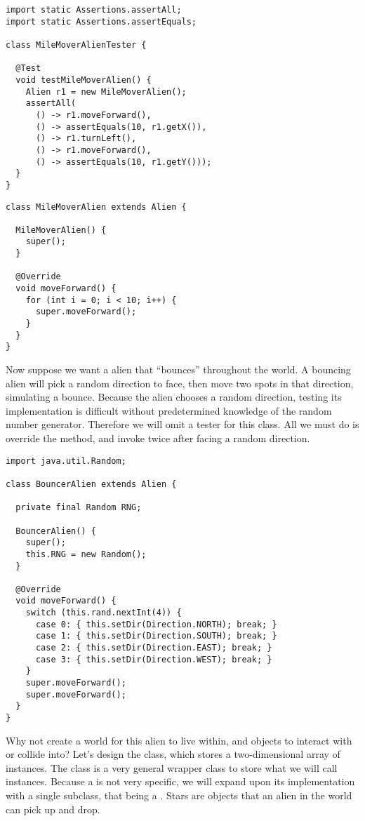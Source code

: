 \begin{lstlisting}[language=MyJava]
import static Assertions.assertAll;
import static Assertions.assertEquals;

class MileMoverAlienTester {

  @Test
  void testMileMoverAlien() {
    Alien r1 = new MileMoverAlien();
    assertAll(
      () -> r1.moveForward(),
      () -> assertEquals(10, r1.getX()),
      () -> r1.turnLeft(),
      () -> r1.moveForward(),
      () -> assertEquals(10, r1.getY()));
  }
}
\end{lstlisting}

\begin{lstlisting}[language=MyJava]
class MileMoverAlien extends Alien {

  MileMoverAlien() { 
    super(); 
  }

  @Override
  void moveForward() {
    for (int i = 0; i < 10; i++) { 
      super.moveForward(); 
    }
  }
}
\end{lstlisting}

Now suppose we want a alien that ``bounces'' throughout the world. 
A bouncing alien will pick a random direction to face, then move two spots in that direction, simulating a bounce. 
Because the alien chooses a random direction, testing its implementation is difficult without predetermined knowledge of the random number generator. 
Therefore we will omit a tester for this class. 
All we must do is override the  method, and invoke  twice after facing a random direction.

\begin{lstlisting}[language=MyJava]
import java.util.Random;

class BouncerAlien extends Alien {

  private final Random RNG;

  BouncerAlien() {
    super();
    this.RNG = new Random();
  }

  @Override
  void moveForward() {
    switch (this.rand.nextInt(4)) {
      case 0: { this.setDir(Direction.NORTH); break; }
      case 1: { this.setDir(Direction.SOUTH); break; }
      case 2: { this.setDir(Direction.EAST); break; }
      case 3: { this.setDir(Direction.WEST); break; }
    }
    super.moveForward();
    super.moveForward();
  }
}
\end{lstlisting}

Why not create a world for this alien to live within, and objects to interact with or collide into? 
Let's design the  class, which stores a two-dimensional array of  instances.
The  class is a very general wrapper class to store what we will call  instances. 
Because a  is not very specific, we will expand upon its implementation with a single subclass, that being a . 
Stars are objects that an alien in the world can pick up and drop. 

